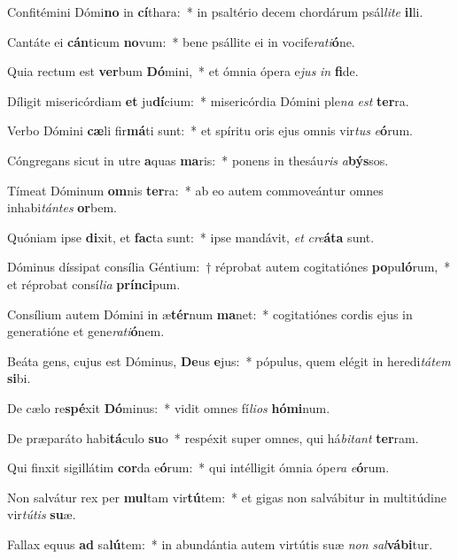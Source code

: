 \item Confitémini Dómi\textbf{no} in \textbf{cí}thara:~* in psaltério decem chordárum psál\textit{li}\textit{te} \textbf{il}li.
\item Cantáte ei \textbf{cán}ticum \textbf{no}vum:~* bene psállite ei in vocife\textit{ra}\textit{ti}\textbf{ó}ne.
\item Quia rectum est \textbf{ver}bum \textbf{Dó}mini,~* et ómnia ópera e\textit{jus} \textit{in} \textbf{fi}de.
\item Díligit misericórdiam \textbf{et} ju\textbf{dí}cium:~* misericórdia Dómini ple\textit{na} \textit{est} \textbf{ter}ra.
\item Verbo Dómini \textbf{cæ}li fir\textbf{má}ti sunt:~* et spíritu oris ejus omnis vir\textit{tus} \textit{e}\textbf{ó}rum.
\item Cóngregans sicut in utre \textbf{a}quas \textbf{ma}ris:~* ponens in thesáu\textit{ris} \textit{a}\textbf{býs}sos.
\item Tímeat Dóminum \textbf{om}nis \textbf{ter}ra:~* ab eo autem commoveántur omnes inhabi\textit{tán}\textit{tes} \textbf{or}bem.
\item Quóniam ipse \textbf{di}xit, et \textbf{fac}ta sunt:~* ipse mandávit, \textit{et} \textit{cre}\textbf{á}\textbf{ta} sunt.
\item Dóminus díssipat consília Géntium:~† réprobat autem cogitatiónes \textbf{po}pu\textbf{ló}rum,~* et réprobat consí\textit{li}\textit{a} \textbf{prín}\textbf{ci}pum.
\item Consílium autem Dómini in æ\textbf{tér}num \textbf{ma}net:~* cogitatiónes cordis ejus in generatióne et gene\textit{ra}\textit{ti}\textbf{ó}nem.
\item Beáta gens, cujus est Dóminus, \textbf{De}us \textbf{e}jus:~* pópulus, quem elégit in heredi\textit{tá}\textit{tem} \textbf{si}bi.
\item De cælo re\textbf{spé}xit \textbf{Dó}minus:~* vidit omnes fí\textit{li}\textit{os} \textbf{hó}\textbf{mi}num.
\item De præparáto habi\textbf{tá}culo \textbf{su}o~* respéxit super omnes, qui há\textit{bi}\textit{tant} \textbf{ter}ram.
\item Qui finxit sigillátim \textbf{cor}da e\textbf{ó}rum:~* qui intélligit ómnia ópe\textit{ra} \textit{e}\textbf{ó}rum.
\item Non salvátur rex per \textbf{mul}tam vir\textbf{tú}tem:~* et gigas non salvábitur in multitúdine vir\textit{tú}\textit{tis} \textbf{su}æ.
\item Fallax equus \textbf{ad} sa\textbf{lú}tem:~* in abundántia autem virtútis suæ \textit{non} \textit{sal}\textbf{vá}\textbf{bi}tur.
